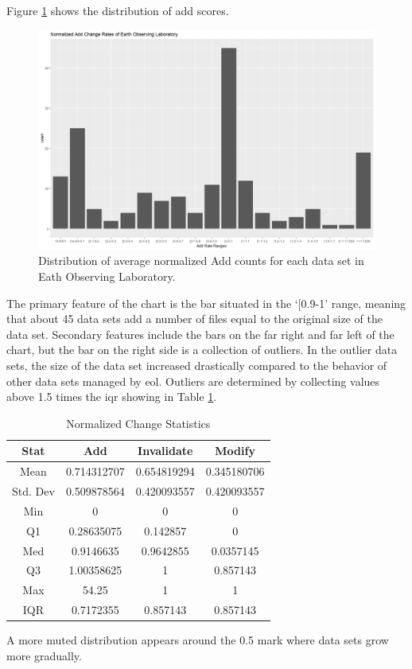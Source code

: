 Figure \ref{EOL_Adds} shows the distribution of \gls{add} scores.
\begin{figure}%
	\centering
	\includegraphics[scale=.43]{figures/Eol_Adds.png}
	\caption{Distribution of average normalized Add counts for each data set in Eath Observing Laboratory.}
	\label{EOL_Adds}
\end{figure}
The primary feature of the chart is the bar situated in the `[0.9-1' range, meaning that about 45 data sets add a number of files equal to the original size of the data set.
Secondary features include the bars on the far right and far left of the chart, but the bar on the right side is a collection of outliers.
In the outlier data sets, the size of the data set increased drastically compared to the behavior of other data sets managed by \gls{eol}.
Outliers are determined by collecting values above 1.5 times the \gls{iqr} showing in Table \ref{table:EOL_Change}.
\begin{table}
	\caption{Normalized Change Statistics}
	\label{table:EOL_Change}
	\centering
	\begin{tabular}{|c|c|c|c|}
		\hline
		Stat&	Add&	Invalidate&	Modify\\ \hline
		Mean&	0.714312707&	0.654819294&	0.345180706\\
		Std. Dev&	0.509878564&	0.420093557&	0.420093557\\
		Min&	0&	0&	0\\
		Q1&	0.28635075&	0.142857&	0\\
		Med&	0.9146635&	0.9642855&	0.0357145\\
		Q3&	1.00358625&	1&	0.857143\\
		Max&	54.25&	1&	1\\
		IQR&	0.7172355&	0.857143&	0.857143\\
		\hline
	\end{tabular}
\end{table}
A more muted distribution appears around the 0.5 mark where data sets grow more gradually.

